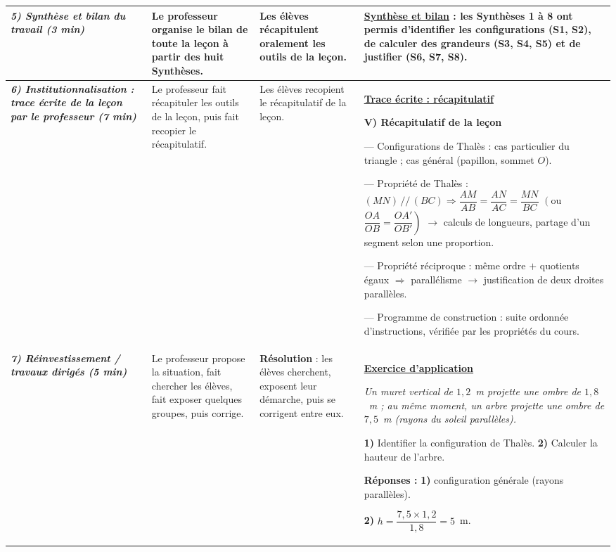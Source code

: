 \documentclass[10pt]{article}
\newcommand{\titreR}[1]{\underline{\textcolor{rougetitre}{\bfseries #1}}}
\newcommand{\app}{\titreR{Exercice d'application}}
\newcommand{\moment}[1]{\textbf{\itshape #1}}
\newcommand{\mclef}[1]{\colorbox{jaunesurl}{#1}}
\begin{document}
\begin{longtable}{|p{2.35cm}|p{5.35cm}|p{4.55cm}|p{13.85cm}|}
\moment{5) Synthèse et bilan du travail (3 min)} &
Le professeur organise le bilan de toute la leçon à partir des huit Synthèses. &
Les élèves récapitulent oralement les outils de la leçon. &
\titreR{Synthèse et bilan} : les Synthèses 1 à 8 ont permis d'identifier les
configurations (S1, S2), de calculer des grandeurs (S3, S4, S5) et de justifier
(S6, S7, S8). \\ \hline

\moment{6) Institutionnalisation : trace écrite de la leçon par le professeur (7 min)} &
Le professeur fait récapituler les outils de la leçon, puis fait recopier le récapitulatif. &
Les élèves recopient  le récapitulatif de la leçon. &
\titreR{Trace écrite : récapitulatif} \par
\textbf{V) Récapitulatif de la leçon} \par
— \mclef{Configurations de Thalès :} cas particulier du triangle ; cas général
(papillon, sommet $O$). \par
— \mclef{Propriété de Thalès :} $(MN)\,//\,(BC)\Rightarrow\dfrac{AM}{AB}
=\dfrac{AN}{AC}=\dfrac{MN}{BC}$ $\left(\right.$ou $\dfrac{OA}{OB}=\dfrac{OA'}{OB'}\left.\right)$
$\to$ calculs de longueurs, partage d'un segment selon une proportion. \par
— \mclef{Propriété réciproque :} même ordre $+$ quotients égaux $\Rightarrow$
parallélisme $\to$ justification de deux droites parallèles. \par
— \mclef{Programme de construction :} suite ordonnée d'instructions, vérifiée par
les propriétés du cours. \\ \hline

\moment{7) Réinvestissement / travaux dirigés (5 min)} &
Le professeur propose la situation, fait chercher les élèves, fait exposer quelques groupes, puis corrige. &
\textbf{Résolution} : les élèves cherchent, exposent leur démarche, puis se corrigent entre eux. &
\app \par
\textit{Un muret vertical de $1{,}2$~m projette une ombre de $1{,}8$~m ; au même
moment, un arbre projette une ombre de $7{,}5$~m (rayons du soleil parallèles).} \par
\textbf{1)} Identifier la configuration de Thalès. \quad
\textbf{2)} Calculer la hauteur de l'arbre. \par
\textbf{Réponses :} \textbf{1)} configuration générale (rayons parallèles). \par
\textbf{2)} $h=\dfrac{7{,}5\times1{,}2}{1{,}8}=5$~m. \\ \hline


\end{longtable}
\end{document}
